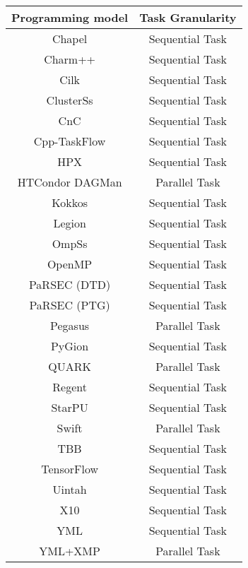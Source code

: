 \begin{tabular}{cc}
\hline
Programming model & Task Granularity \\
\hline
Chapel & Sequential Task\\
Charm++ & Sequential Task\\
Cilk & Sequential Task\\
ClusterSs & Sequential Task\\
CnC & Sequential Task\\
Cpp-TaskFlow & Sequential Task\\
HPX & Sequential Task\\
HTCondor DAGMan & Parallel Task\\
Kokkos & Sequential Task\\
Legion & Sequential Task\\
OmpSs & Sequential Task\\
OpenMP & Sequential Task\\
PaRSEC (DTD) & Sequential Task\\
PaRSEC (PTG) & Sequential Task\\
Pegasus & Parallel Task\\
PyGion & Sequential Task\\
QUARK & Parallel Task\\
Regent & Sequential Task\\
StarPU & Sequential Task\\
Swift & Parallel Task\\
TBB & Sequential Task\\
TensorFlow & Sequential Task\\
Uintah & Sequential Task\\
X10 & Sequential Task\\
YML & Sequential Task\\
YML+XMP & Parallel Task\\
\hline
\end{tabular}
